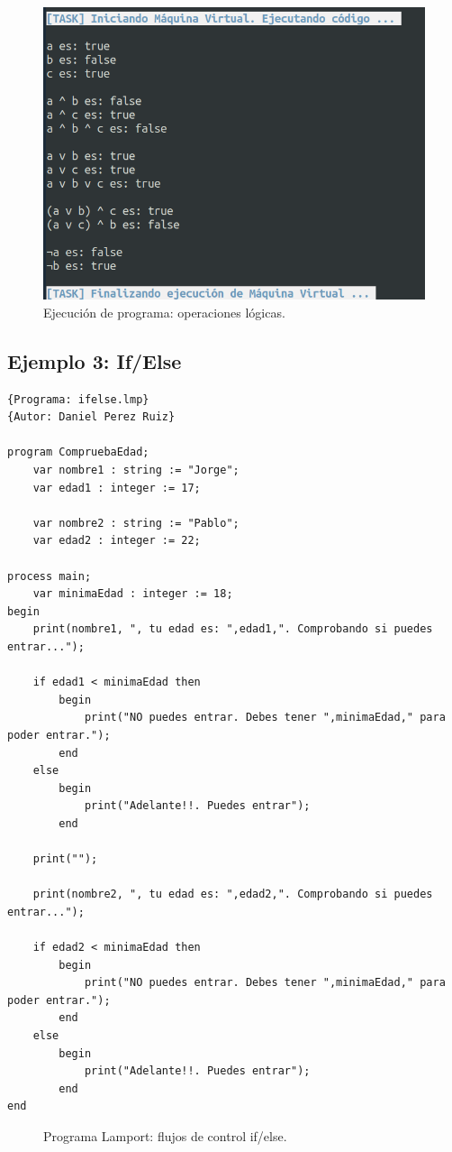 \newpage
\begin{figure}[h]
    \includegraphics[width=\linewidth]{images/ejemplos/logical_operations.png}
    \caption{Ejecución de programa: operaciones lógicas.}
    \label{fig:lamportLogicalOperations_exec}
\end{figure}

\newpage
\subsection{Ejemplo 3: If/Else}
\begin{lstlisting}[style=lamportStyle]
{Programa: ifelse.lmp}
{Autor: Daniel Perez Ruiz}

program CompruebaEdad;
	var nombre1 : string := "Jorge";
	var edad1 : integer := 17;
	
	var nombre2 : string := "Pablo";
	var edad2 : integer := 22;
	
process main;
	var minimaEdad : integer := 18;
begin
	print(nombre1, ", tu edad es: ",edad1,". Comprobando si puedes entrar...");
	
	if edad1 < minimaEdad then
		begin
			print("NO puedes entrar. Debes tener ",minimaEdad," para poder entrar.");
		end
	else
		begin
			print("Adelante!!. Puedes entrar");
		end
		
	print("");
		
	print(nombre2, ", tu edad es: ",edad2,". Comprobando si puedes entrar...");
	
	if edad2 < minimaEdad then
		begin
			print("NO puedes entrar. Debes tener ",minimaEdad," para poder entrar.");
		end
	else
		begin
			print("Adelante!!. Puedes entrar");
		end
end
\end{lstlisting}
\begin{figure}[h]
\caption{Programa Lamport: flujos de control if/else.}
\label{fig:lamportIfElse}
\end{figure}

